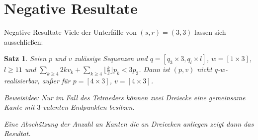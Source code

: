 \documentclass[10pt, notheorems]{beamer}
\newtheorem{theorem}{Satz}[section]
\begin{document}
\section{Negative Resultate}

\begin{frame}{Negative Resultate}
  Viele der Unterfälle von $(s, r) = (3, 3)$ lassen sich ausschließen:
  \begin{theorem}
    Seien $p$ und $v$ zulässige Sequenzen und $q = [q_3 \times 3, q_l \times l]$, $w = [1 \times 3]$, $l \geq 11$ und $\sum_{k \geq 4} 2k  v_k + \sum_{k \geq 4} \lfloor \tfrac{k}{2} \rfloor p_k < 3p_3$. Dann ist $(p, v)$ nicht $q$-$w$-realisierbar, außer für $p = [4 \times 3]$, $v = [4 \times 3]$.
    \medskip\\
    \pause
    { \normalfont
      Beweisidee: Nur im Fall des Tetraeders können zwei Dreiecke eine gemeinsame Kante mit $3$-valenten Endpunkten besitzen.

      { \centering
        \par
      }
      Eine Abschätzung der Anzahl an Kanten die an Dreiecken anliegen zeigt dann das Resultat.
    }
  \end{theorem}
\end{frame}
\end{document}
